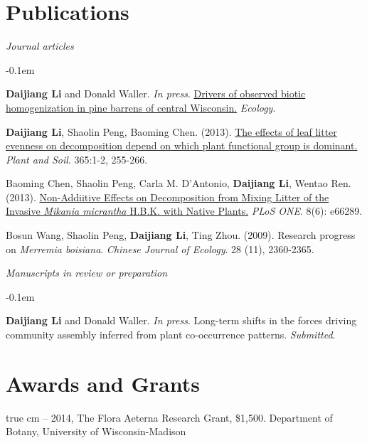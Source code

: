 \documentclass[11pt,oneside]{article}
\def\ind{\vspace{0.3em} \hangindent=1.25 true cm\hangafter=1 \noindent }
\begin{document}
\section{Publications}
\noindent\emph{Journal articles}
\vspace{0.05in}
\begin{revnumerate}
\itemsep -0.1em 
	\item \textbf{Daijiang Li} and Donald Waller. \emph{In press}. \href{http://www.esajournals.org/doi/abs/10.1890/14-0893.1}{Drivers of observed biotic homogenization in pine barrens of central Wisconsin.} \emph{Ecology}.

	\item \textbf{Daijiang Li}, Shaolin Peng, Baoming Chen. (2013). \href{http://www.daijiang.name/pdf/D_Li_2012_plantsoil.pdf}{The effects of leaf litter evenness on decomposition depend on which plant functional group is dominant.} \emph{Plant and Soil}. 365:1-2, 255-266. 

	\item Baoming Chen, Shaolin Peng, Carla M. D'Antonio, \textbf{Daijiang Li}, Wentao Ren. (2013). \href{http://www.plosone.org/article/info%3Adoi%2F10.1371%2Fjournal.pone.0066289}{Non-Addiitive Effects on Decomposition from Mixing Litter of the Invasive \emph{Mikania micrantha} H.B.K. with Native Plants.} \emph{PLoS ONE}. 8(6): e66289.


	\item Bosun Wang, Shaolin Peng, \textbf{Daijiang Li}, Ting Zhou. (2009). Research progress on \emph{Merremia boisiana}. \emph{Chinese Journal of Ecology}. 28 (11), 2360-2365.
\end{revnumerate}

\noindent\emph{Manuscripts in review or preparation}
\vspace{0.05in}
\begin{revnumerate}
\itemsep -0.1em 
	\item \textbf{Daijiang Li} and Donald Waller. \emph{In press}. Long-term shifts in the forces driving community assembly inferred from plant co-occurrence patterns. \emph{Submitted}.
\end{revnumerate}


\section{Awards and Grants}
\ind 2013 -- 2014, The Flora Aeterna Research Grant, \$1,500. Department of Botany, University of Wisconsin-Madison
\end{document}
